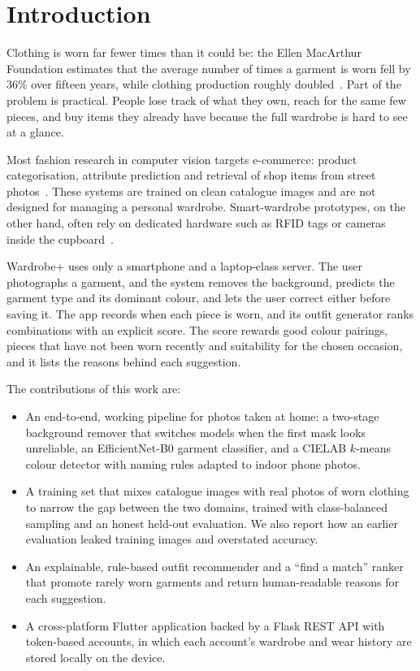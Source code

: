 \documentclass[conference]{IEEEtran}
\begin{document}
\section{Introduction}
Clothing is worn far fewer times than it could be: the Ellen MacArthur Foundation estimates that the average number of times a garment is worn fell by 36\% over fifteen years, while clothing production roughly doubled~\cite{emf2017}. Part of the problem is practical. People lose track of what they own, reach for the same few pieces, and buy items they already have because the full wardrobe is hard to see at a glance.

Most fashion research in computer vision targets e-commerce: product categorisation, attribute prediction and retrieval of shop items from street photos~\cite{liu2016deepfashion,kiapour2015street2shop,ji2020pipeline}. These systems are trained on clean catalogue images and are not designed for managing a personal wardrobe. Smart-wardrobe prototypes, on the other hand, often rely on dedicated hardware such as RFID tags or cameras inside the cupboard~\cite{goh2011smart,banoth2022nextgen}.

Wardrobe+ uses only a smartphone and a laptop-class server. The user photographs a garment, and the system removes the background, predicts the garment type and its dominant colour, and lets the user correct either before saving it. The app records when each piece is worn, and its outfit generator ranks combinations with an explicit score. The score rewards good colour pairings, pieces that have not been worn recently and suitability for the chosen occasion, and it lists the reasons behind each suggestion.

The contributions of this work are:
\begin{itemize}
  \item An end-to-end, working pipeline for photos taken at home: a two-stage background remover that switches models when the first mask looks unreliable, an EfficientNet-B0 garment classifier, and a CIELAB $k$-means colour detector with naming rules adapted to indoor phone photos.
  \item A training set that mixes catalogue images with real photos of worn clothing to narrow the gap between the two domains, trained with class-balanced sampling and an honest held-out evaluation. We also report how an earlier evaluation leaked training images and overstated accuracy.
  \item An explainable, rule-based outfit recommender and a ``find a match'' ranker that promote rarely worn garments and return human-readable reasons for each suggestion.
  \item A cross-platform Flutter application backed by a Flask REST API with token-based accounts, in which each account's wardrobe and wear history are stored locally on the device.
\end{itemize}
\end{document}
